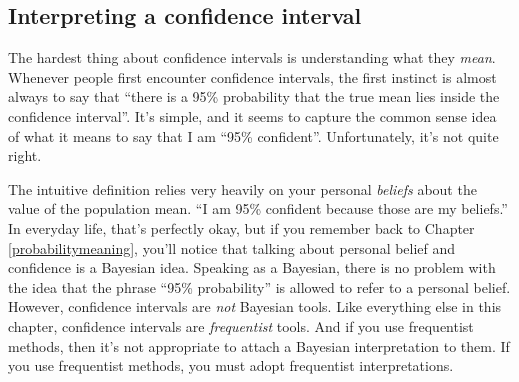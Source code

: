 \documentclass[
]{book}
\theoremstyle{definition}
\theoremstyle{definition}
\theoremstyle{definition}
\theoremstyle{definition}
\theoremstyle{remark}
\begin{document}
\hypertarget{interpreting-a-confidence-interval}{%
\subsection{Interpreting a confidence interval}\label{interpreting-a-confidence-interval}}

The hardest thing about confidence intervals is understanding what they \emph{mean}. Whenever people first encounter confidence intervals, the first instinct is almost always to say that ``there is a 95\% probability that the true mean lies inside the confidence interval''. It's simple, and it seems to capture the common sense idea of what it means to say that I am ``95\% confident''. Unfortunately, it's not quite right.

The intuitive definition relies very heavily on your personal \emph{beliefs} about the value of the population mean. ``I am 95\% confident because those are my beliefs.'' In everyday life, that's perfectly okay, but if you remember back to Chapter \ref{probabilitymeaning}, you'll notice that talking about personal belief and confidence is a Bayesian idea. Speaking as a Bayesian, there is no problem with the idea that the phrase ``95\% probability'' is allowed to refer to a personal belief. However, confidence intervals are \emph{not} Bayesian tools. Like everything else in this chapter, confidence intervals are \emph{frequentist} tools. And if you use frequentist methods, then it's not appropriate to attach a Bayesian interpretation to them. If you use frequentist methods, you must adopt frequentist interpretations.
\end{document}
